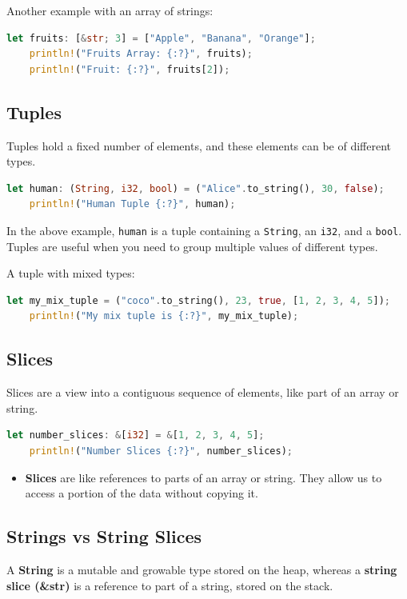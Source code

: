 \documentclass[a4paper,12pt]{report}
\begin{document}
	\noindent Another example with an array of strings:

\begin{lstlisting}[language=Rust]
	let fruits: [&str; 3] = ["Apple", "Banana", "Orange"];
	println!("Fruits Array: {:?}", fruits);
	println!("Fruit: {:?}", fruits[2]);
\end{lstlisting}

\subsection*{Tuples}
Tuples hold a fixed number of elements, and these elements can be of different types.

\begin{lstlisting}[language=Rust]
	let human: (String, i32, bool) = ("Alice".to_string(), 30, false);
	println!("Human Tuple {:?}", human);
\end{lstlisting}

	\noindent In the above example, \texttt{human} is a tuple containing a \texttt{String}, an \texttt{i32}, and a \texttt{bool}. Tuples are useful when you need to group multiple values of different types.

A tuple with mixed types:

\begin{lstlisting}[language=Rust]
	let my_mix_tuple = ("coco".to_string(), 23, true, [1, 2, 3, 4, 5]);
	println!("My mix tuple is {:?}", my_mix_tuple);
\end{lstlisting}

\subsection*{Slices}
Slices are a view into a contiguous sequence of elements, like part of an array or string.

\begin{lstlisting}[language=Rust]
	let number_slices: &[i32] = &[1, 2, 3, 4, 5];
	println!("Number Slices {:?}", number_slices);
\end{lstlisting}

\begin{itemize}
	\item \textbf{Slices} are like references to parts of an array or string. They allow us to access a portion of the data without copying it.
\end{itemize}

\subsection*{Strings vs String Slices}
A \textbf{String} is a mutable and growable type stored on the heap, whereas a \textbf{string slice (\&str)} is a reference to part of a string, stored on the stack.
\end{document}
